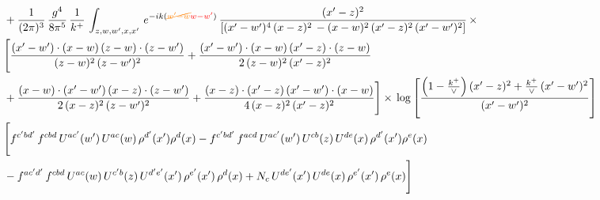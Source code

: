 \documentclass[9pt]{article}
\numberwithin{equation}{section}
\begin{document}
\begin{align}
&  + \frac{1}{(2\pi)^{3}}\, \frac{g^{4}}{8\pi^{5}}\,\frac{1}{k^{+}}\,\int_{z,w,w^{\prime},x,x'}\, e^{-ik({\color{orange}\cancel{w^{\prime}-w}}{\color{red}w-w^{\prime}})}\, \frac{(x'-z)^{2}}{\left[(x'-w')^{4}\,(x-z)^{2}\, - (x-w)^{2}\, (x'-z)^{2}\,(x'-w')^{2}\right]}\,  \times\notag \\ & \Bigg[\frac{(x'-w')\cdot (x-w)\, (z-w)\cdot (z-w')}{(z-w)^{2}\, (z-w')^{2}}+\frac{(x'-w')\cdot (x-w)\, (x'-z)\cdot (z-w)}{2\, (z-w)^{2}\, (x'-z)^{2}}\notag \\ & +\frac{(x-w)\cdot (x'-w')\, (x-z)\cdot (z-w')}{2\, (x-z)^{2}\, (z-w')^{2}}+\frac{(x-z)\cdot (x'-z)\, (x'-w')\cdot (x-w)}{4\, (x-z)^{2}\, (x'-z)^{2}}\Bigg] \times\,\log{\left[\frac{\left(1-\frac{k^{+}}{\vee}\right)(x'-z)^{2}+\frac{k^{+}}{\vee}\,(x'-w')^{2}}{(x'-w')^{2}}\right]} \notag \\ & \Bigg[f^{c'bd'}\,f^{cbd}\, U^{ac'}(w')\,U^{ac}(w)\,\rho^{d'}(x')\rho^{d}(x)- f^{c'bd'}\,f^{acd}\,U^{ac'}(w')\,U^{cb}(z)\,U^{de}(x)\,\rho^{d'}(x')\rho^{e}(x) \notag \\ & -f^{ac'd'}\,f^{cbd}\,U^{ac}(w)\,U^{c'b}(z)\,U^{d'e'}(x')\,\rho^{e'}(x')\,\rho^{d}(x) +N_{c}\,U^{de'}(x')\,U^{de}(x)\,\rho^{e'}(x')\,\rho^{e}(x)\Bigg]
\end{align}
\end{document}
